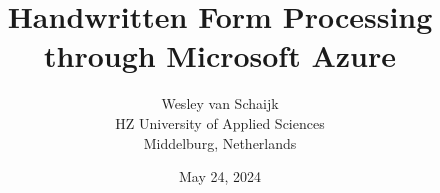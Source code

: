 \documentclass{article}
\title{Handwritten Form Processing through Microsoft Azure}
\author{Wesley van Schaijk \\ HZ University of Applied Sciences \\ Middelburg, Netherlands}
\date{May 24, 2024}
\begin{document}
\maketitle

\begin{multicols}{2}
    
    
    
\end{multicols}

{
    \newpage
    \raggedright
    
    
}
\end{document}
